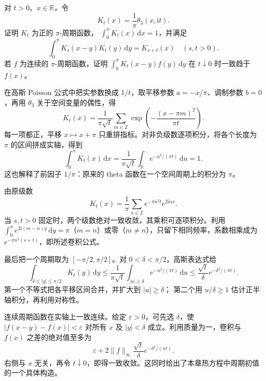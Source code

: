\begin{exercise}\label{b3:ex:24-3}
对 \(t>0\)、\(x\in\mathbb R\)，令
\[
K_t(x)=\frac1\pi\theta_3(x,\mathrm{i}t).
\]
证明 \(K_t\) 为正的 \(\pi\)-周期函数，
\(\int_0^\pi K_t(x)\,\mathrm dx=1\)，并满足
\[
\int_0^\pi K_s(x-y)K_t(y)\,\mathrm dy=K_{s+t}(x)
\quad(s,t>0).
\]
若 \(f\) 为连续的 \(\pi\)-周期函数，证明
\(\int_0^\pi K_t(x-y)f(y)\,\mathrm dy\) 在 \(t\downarrow0\) 时一致趋于 \(f(x)\)。
\end{exercise}
\begin{solution}
在高斯 Poisson 公式中把实参数换成 \(1/t\)，取平移参数 \(a=-x/\pi\)、调制参数 \(b=0\)，再用 \(\theta_3\) 关于空间变量的偶性，得
\[
K_t(x)=\frac1{\pi\sqrt t}
       \sum_{m\in\mathbb Z}
       \exp\!\left(-\frac{(x-\pi m)^2}{\pi t}\right).
\]
每一项都正，平移 \(x\mapsto x+\pi\) 只重排指标。对非负级数逐项积分，将各个长度为 \(\pi\) 的区间拼成实轴，得到
\[
\int_0^\pi K_t(x)\,\mathrm dx
=\frac1{\pi\sqrt t}\int_{\mathbb R}e^{-u^2/(\pi t)}\,\mathrm du=1.
\]
这也解释了前因子 \(1/\pi\)：原来的 theta 函数在一个空间周期上的积分为 \(\pi\)。

由原级数
\[
K_t(x)=\frac1\pi\sum_{n\in\mathbb Z}
               e^{-\pi n^2t}e^{2\mathrm{i}nx}.
\]
当 \(s,t>0\) 固定时，两个级数绝对一致收敛，其乘积可逐项积分。利用
\(\int_0^\pi e^{2\mathrm{i}(m-n)y}\,\mathrm dy
=\pi\)（\(m=n\)）或零（\(m\ne n\)），只留下相同频率，系数相乘成为
\(e^{-\pi n^2(s+t)}\)，即所述卷积公式。

最后把一个周期取为 \([-\pi/2,\pi/2]\)。对 \(0<\delta<\pi/2\)，高斯表达式给
\[
\int_{\delta\le |y|\le\pi/2}K_t(y)\,\mathrm dy
\le \frac1{\pi\sqrt t}
             \int_{|u|\ge\delta}e^{-u^2/(\pi t)}\,\mathrm du
\le \frac{\sqrt t}{\delta}e^{-\delta^2/(\pi t)}.
\]
第一个不等式把各平移区间合并，并扩大到 \(|u|\ge\delta\)；
第二个用 \(u/\delta\ge1\) 估计正半轴积分，再利用对称性。

连续周期函数在实轴上一致连续。给定 \(\varepsilon>0\)，可先选 \(\delta\)，使
\(|f(x-y)-f(x)|<\varepsilon\) 对所有 \(x\) 及 \(|y|<\delta\) 成立。利用质量为一，卷积与 \(f(x)\) 之差的绝对值至多为
\[
\varepsilon+
2\|f\|_\infty\frac{\sqrt t}{\delta}e^{-\delta^2/(\pi t)}.
\]
右侧与 \(x\) 无关，再令 \(t\downarrow0\)，即得一致收敛。这同时给出了本章热方程中周期初值的一个具体构造。
\end{solution}

